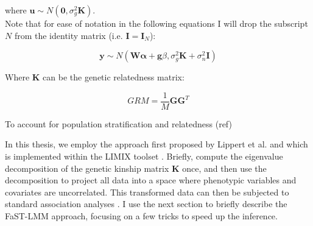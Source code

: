 where $\mathbf{u} \sim N(\mathbf{0}, \sigma_g^2\mathbf{K})$.\\


Note that for ease of notation in the following equations I will drop the subscript $N$ from the identity matrix (i.e. $\mathbf{I} = \mathbf{I}_N$):

\begin{equation}\label{eq:LMM_MVN}
 \mathbf{y} \sim  N(\mathbf{W}\boldsymbol{\alpha} + \mathbf{g}\beta, \sigma_g^2\mathbf{K} + \sigma_n^2\mathbf{I})
\end{equation}

Where $\mathbf{K}$ can be the genetic relatedness matrix:

\begin{equation}
    GRM = \frac{1}{M}\mathbf{G}\mathbf{G}^T
\end{equation}




To account for population stratification and relatedness (ref)







In this thesis, we employ the approach first proposed by Lippert et al. \cite{lippert2011fast} and which is implemented within the LIMIX toolset \cite{lippert2014limix,casale2015efficient}. 
Briefly, \cite{lippert2014limix} compute the eigenvalue decomposition of the genetic kinship matrix $\mathbf{K}$ once, and then use the decomposition to project all data into a space where phenotypic variables and covariates are uncorrelated. 
This transformed data can then be subjected to standard association analyses \cite{lippert2014limix}.
I use the next section to briefly describe the FaST-LMM approach, focusing on a few tricks to speed up the inference.

